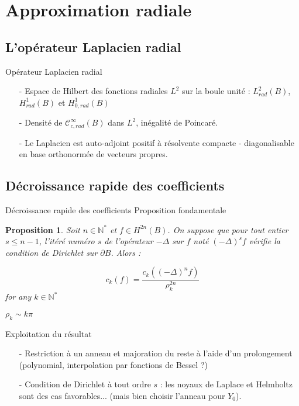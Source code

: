 \documentclass[11pt]{beamer}
\theoremstyle{plain}
\newtheorem{Prop}{Proposition}[section]
\theoremstyle{definition}
\newcommand{\Hrad}{H^1_{rad}(B)}
\newcommand{\Hzrad}{H^1_{0,rad}(B)}
\begin{document}
\section{Approximation radiale}
\subsection{L'opérateur Laplacien radial}
\begin{frame}{Opérateur Laplacien radial}
\begin{itemize}
\item[-] Espace de Hilbert des fonctions radiales $L^2$ sur la boule unité : $L^2_{rad}(B)$, $\Hrad$ et $\Hzrad$ 
\item[-] Densité de $\mathcal{C}^{\infty}_{c,rad}(B)$ dans $L^2$, inégalité de Poincaré. 
\item[-] Le Laplacien est auto-adjoint positif à résolvente compacte - diagonalisable en base orthonormée de vecteurs propres. 
\end{itemize} 
\end{frame}

\subsection{Décroissance rapide des coefficients}


\begin{frame}{Décroissance rapide des coefficients}
Proposition fondamentale
\begin{Prop} Soit $n\in \mathbb{N}^*$ et $f \in H^{2n}(B)$. On suppose que pour tout entier $s\leq n-1$, l'itéré numéro $s$ de l'opérateur $-\Delta$ sur $f$ noté $(-\Delta)^s f$ vérifie la condition de Dirichlet sur $\partial B$. Alors :

\[ c_k(f) = \dfrac{c_k\left(\left(-\Delta\right)^n f\right)}{\rho_{k}^{2n}}\] for any $k \in \mathbb{N}^*$
\label{PropDecrCond}
\end{Prop}
\begin{center}
$\rho_k \sim k\pi$ 
\end{center}
\end{frame}

\begin{frame}
Exploitation du résultat 
\begin{itemize}
\item[-] Restriction à un anneau et majoration du reste à l'aide d'un prolongement (polynomial, interpolation par fonctions de Bessel ?)
\item[-] Condition de Dirichlet à tout ordre $s$ : les noyaux de Laplace et Helmholtz sont des cas favorables... (mais bien choisir l'anneau pour $Y_0$).
\end{itemize}
\end{frame}
\end{document}
